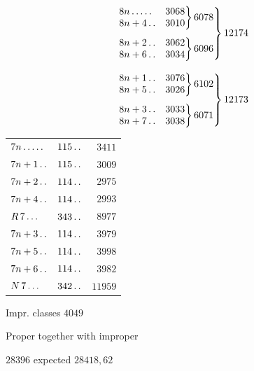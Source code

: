 \[
\begin{aligned}
&\left.\begin{gathered}
\left.\begin{array}{@{}lr@{}}8n\mathinner{.\,.\,.\,.\,.}&3068\\8n+4\mathinner{.\,.}&3010\end{array}\right\}6078\\[4pt]
\left.\begin{array}{@{}lr@{}}8n+2\mathinner{.\,.}&3062\\8n+6\mathinner{.\,.}&3034\end{array}\right\}6096
\end{gathered}\right\}12174\\[8pt]
&\left.\begin{gathered}
\left.\begin{array}{@{}lr@{}}8n+1\mathinner{.\,.}&3076\\8n+5\mathinner{.\,.}&3026\end{array}\right\}6102\\[4pt]
\left.\begin{array}{@{}lr@{}}8n+3\mathinner{.\,.}&3033\\8n+7\mathinner{.\,.}&3038\end{array}\right\}6071
\end{gathered}\right\}12173
\end{aligned}
\]
\begin{center}\begin{tabular}{@{}lrr@{}}
$7n\mathinner{.\,.\,.\,.\,.}$ & $115\mathinner{.\,.}$ & $3411$\\
$7n+1\mathinner{.\,.}$ & $115\mathinner{.\,.}$ & $3009$\\
$7n+2\mathinner{.\,.}$ & $114\mathinner{.\,.}$ & $2975$\\
$7n+4\mathinner{.\,.}$ & $114\mathinner{.\,.}$ & $2993$\\
$R\,7\mathinner{.\,.\,.}$ & $343\mathinner{.\,.}$ & $8977$\\
$7n+3\mathinner{.\,.}$ & $114\mathinner{.\,.}$ & $3979$\\
$7n+5\mathinner{.\,.}$ & $114\mathinner{.\,.}$ & $3998$\\
$7n+6\mathinner{.\,.}$ & $114\mathinner{.\,.}$ & $3982$\\
$N\,7\mathinner{.\,.\,.}$ & $342\mathinner{.\,.}$ & $11959$
\end{tabular}\end{center}
\noindent Impr. classes $4049$
\par\noindent Proper together with improper
\par\noindent\quad $28396$ expected $28418{,}62$

